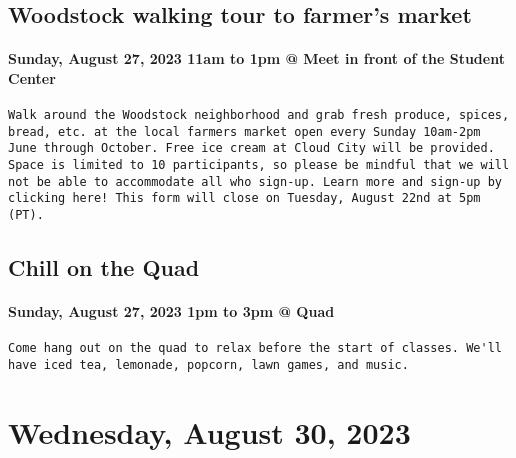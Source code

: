 \documentclass[
]{article}
\begin{document}
\hypertarget{woodstock-walking-tour-to-farmers-market}{%
\subsection{Woodstock walking tour to farmer's
market}\label{woodstock-walking-tour-to-farmers-market}}

\hypertarget{sunday-august-27-2023-11am-to-1pm-meet-in-front-of-the-student-center}{%
\paragraph{Sunday, August 27, 2023 11am to 1pm @ Meet in front of the
Student
Center}\label{sunday-august-27-2023-11am-to-1pm-meet-in-front-of-the-student-center}}

\begin{verbatim}
Walk around the Woodstock neighborhood and grab fresh produce, spices, bread, etc. at the local farmers market open every Sunday 10am-2pm June through October. Free ice cream at Cloud City will be provided. Space is limited to 10 participants, so please be mindful that we will not be able to accommodate all who sign-up. Learn more and sign-up by clicking here! This form will close on Tuesday, August 22nd at 5pm (PT).
\end{verbatim}

\hypertarget{chill-on-the-quad}{%
\subsection{Chill on the Quad}\label{chill-on-the-quad}}

\hypertarget{sunday-august-27-2023-1pm-to-3pm-quad}{%
\paragraph{Sunday, August 27, 2023 1pm to 3pm @
Quad}\label{sunday-august-27-2023-1pm-to-3pm-quad}}

\begin{verbatim}
Come hang out on the quad to relax before the start of classes. We'll have iced tea, lemonade, popcorn, lawn games, and music.
\end{verbatim}

\hypertarget{wednesday-august-30-2023}{%
\section{Wednesday, August 30, 2023}\label{wednesday-august-30-2023}}
\end{document}
